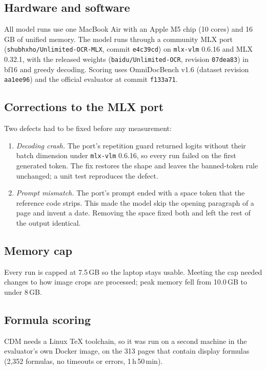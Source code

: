 \documentclass[journal]{IEEEtran}
\begin{document}
\subsection{Hardware and software}

All model runs use one MacBook Air with an Apple M5 chip (10 cores) and 16\,GB of
unified memory. The model runs through a community MLX port
(\texttt{shubhxho/Unlimited-OCR-MLX}, commit \texttt{e4c39cd}) on
\texttt{mlx-vlm} 0.6.16 \cite{canuma2024mlxvlm} and MLX 0.32.1, with the
released weights (\texttt{baidu/Unlimited-OCR}, revision \texttt{07dea83}) in
bf16 and greedy decoding. Scoring uses OmniDocBench v1.6 (dataset revision
\texttt{aa1ee96}) and the official evaluator at commit \texttt{f133a71}.

\subsection{Corrections to the MLX port}

Two defects had to be fixed before any measurement:
\begin{enumerate}
\item \emph{Decoding crash.} The port's repetition guard returned logits without
their batch dimension under \texttt{mlx-vlm} 0.6.16, so every run failed on the
first generated token. The fix restores the shape and leaves the banned-token
rule unchanged; a unit test reproduces the defect.
\item \emph{Prompt mismatch.} The port's prompt ended with a space token that
the reference code strips. This made the model skip the opening paragraph of a
page and invent a date. Removing the space fixed both and left the rest of the
output identical.
\end{enumerate}

\subsection{Memory cap}

Every run is capped at 7.5\,GB so the laptop stays usable. Meeting the cap
needed changes to how image crops are processed; peak memory fell from 10.0\,GB
to under 8\,GB.

\subsection{Formula scoring}

CDM needs a Linux \TeX{} toolchain, so it was run on a second machine in the
evaluator's own Docker image, on the 313 pages that contain display formulas
(2,352 formulas, no timeouts or errors, 1\,h\,50\,min).
\end{document}
